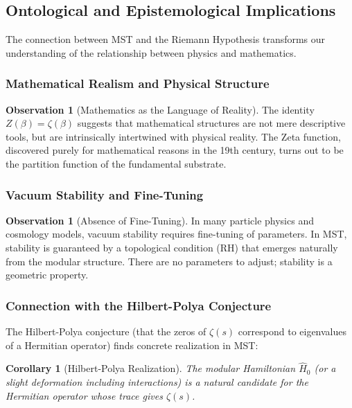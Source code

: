 \documentclass[11pt, a4paper]{article}
\theoremstyle{plain}
\newtheorem{corollary}[theorem]{Corollary}
\theoremstyle{definition}
\newtheorem{observation}[theorem]{Observation}
\begin{document}
\subsection{Ontological and Epistemological Implications}

The connection between MST and the Riemann Hypothesis transforms our understanding of the relationship between physics and mathematics.

\subsubsection{Mathematical Realism and Physical Structure}

\begin{observation}[Mathematics as the Language of Reality]
The identity $Z(\beta) = \zeta(\beta)$ suggests that mathematical structures are not mere descriptive tools, but are intrinsically intertwined with physical reality. The Zeta function, discovered purely for mathematical reasons in the 19th century, turns out to be the partition function of the fundamental substrate.
\end{observation}

\subsubsection{Vacuum Stability and Fine-Tuning}

\begin{observation}[Absence of Fine-Tuning]
In many particle physics and cosmology models, vacuum stability requires fine-tuning of parameters. In MST, stability is guaranteed by a topological condition (RH) that emerges naturally from the modular structure. There are no parameters to adjust; stability is a geometric property.
\end{observation}

\subsubsection{Connection with the Hilbert-Polya Conjecture}

The Hilbert-Polya conjecture (that the zeros of $\zeta(s)$ correspond to eigenvalues of a Hermitian operator) finds concrete realization in MST:

\begin{corollary}[Hilbert-Polya Realization]
The modular Hamiltonian $\hat{H}_0$ (or a slight deformation including interactions) is a natural candidate for the Hermitian operator whose trace gives $\zeta(s)$.
\end{corollary}
\end{document}
